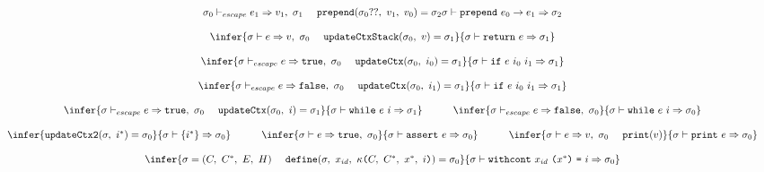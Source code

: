 \documentclass[11pt]{article}
\newcommand{\Term}[1]{\texttt{#1}}
\newcommand{\cs}[0]{\quad}
\newcommand{\symstate}[0]{\sigma}
\newcommand{\symctx}[0]{C}
\newcommand{\symctxstack}[0]{C^*}
\newcommand{\symenv}[0]{E}
\newcommand{\symheap}[0]{H}
\newcommand{\symstatetuple}[4]{(#1,\ #2,\ #3,\ #4)}
\newcommand{\symstdef}[0]
{\symstatetuple{\symctx}{\symctxstack}{\symenv}{\symheap}}
\newcommand{\valcont}[4]{\kappa \Term{(} #1,\ #2,\ #3,\ #4 \Term{)}}
\newcommand{\evalinst}[3]{#1 \vdash #2 \Rightarrow #3}
\newcommand{\evalexpr}[4]{#1 \vdash #2 \Rightarrow #3,\ #4}
\newcommand{\evalescexpr}[4]{#1 \vdash_{escape} #2 \Rightarrow #3,\ #4}
\begin{document}
\[\begin{array}{c}
{\evalescexpr{\symstate_0}{e_1}{v_1}{\symstate_1}\ \ \ \
\Term{prepend}(\symstate_0 ??,\ v_1,\ v_0) = \symstate_2}
{ \evalinst{\symstate}{\Term{prepend}\ e_0 \to e_1}{\symstate_2} }
\\ \\
\infer
{ \evalexpr{\symstate}{e}{v}{\symstate_0}\ \ \ \
\Term{updateCtxStack}(\symstate_0,\ v) = \symstate_1 }
{ \evalinst{\symstate}{\Term{return}\ e}{\symstate_1} }
\\ \\
\infer
{ \evalescexpr{\symstate}{e}{\Term{true}}{\symstate_0}\ \ \ \
\Term{updateCtx}(\symstate_0,\ i_0) = \symstate_1 }
{ \evalinst{\symstate}{\Term{if}\ e\ i_0\ i_1}{\symstate_1} }
\\ \\
\infer
{ \evalescexpr{\symstate}{e}{\Term{false}}{\symstate_0}\ \ \ \
\Term{updateCtx}(\symstate_0,\ i_1) = \symstate_1 }
{ \evalinst{\symstate}{\Term{if}\ e\ i_0\ i_1}{\symstate_1} }
\\ \\
\multicolumn{1}{c}{\begin{array}{ccc}
\infer
{ \evalescexpr{\symstate}{e}{\Term{true}}{\symstate_0}\ \ \ \
\Term{updateCtx}(\symstate_0,\ i) = \symstate_1 }
{ \evalinst{\symstate}{\Term{while}\ e\ i}{\symstate_1} }
&
\cs
&
\infer
{ \evalescexpr{\symstate}{e}{\Term{false}}{\symstate_0} }
{ \evalinst{\symstate}{\Term{while}\ e\ i}{\symstate_0} }
\end{array}}
\\ \\
\multicolumn{1}{c}{\begin{array}{ccccc}
\infer
{ \Term{updateCtx2}(\symstate,\ i^*) = \symstate_0 }
{ \evalinst{\symstate}{\{ i^* \}}{\symstate_0} }
&
\cs
&
\infer
{ \evalexpr{\symstate}{e}{\Term{true}}{\symstate_0} }
{ \evalinst{\symstate}{\Term{assert}\ e}{\symstate_0} }
&
\cs
&
\infer
{ \evalexpr{\symstate}{e}{v}{\symstate_0} \ \ \ \
\Term{print}(v) }
{ \evalinst{\symstate}{\Term{print}\ e}{\symstate_0} }
\end{array}}
\\ \\
\infer
{ \symstate = \symstdef \ \ \ \
\Term{define}(\symstate,\ x_{id},\
\valcont{\symctx}{\symctxstack}{x^*}{i}) = \symstate_0 }
{ \evalinst
{\symstate}
{\Term{withcont}\ x_{id}\ \Term{(}x^*\Term{)}\ \Term{=}\ i}
{\symstate_0} }
\end{array}
\]
\end{document}
